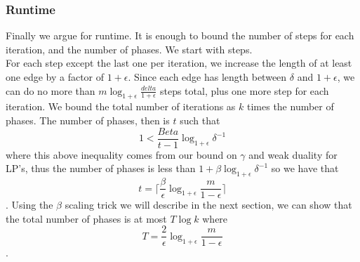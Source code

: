 \subsubsection{Runtime}
Finally we argue for runtime. It is enough to bound the number of
steps for each iteration, and the number of phases. We start with
steps.\\
For each step except the last one per iteration, we increase the
length of at least one edge by a factor of $1+\epsilon$. Since each
edge has length between $\delta$ and $1+\epsilon$, we can do no more
than $m\log_{1+\epsilon}\frac{delta}{1+\epsilon}$ steps total, plus
one more step for each iteration. We bound the total number of
iterations as $k$ times the number of phases. The number of phases,
then is $t$ such that 
$$1<\frac{Beta}{t-1}\log_{1+\epsilon}\delta^{-1}$$
where this above inequality comes from our bound on $\gamma$ and weak
duality for LP's, thus the number of phases is less than
$1+\beta\log_{1+\epsilon}\delta^{-1}$ so we have that 
$$t=\lceil \frac{\beta}{\epsilon}\log_{1+\epsilon}
\frac{m}{1-\epsilon} \rceil$$.
Using the $\beta$ scaling trick we will describe in the next section,
we can show that the total number of phases is at most $T\log k$ where 
$$T=\frac{2}{\epsilon} \log_{1+\epsilon}\frac{m}{1-\epsilon}$$.



